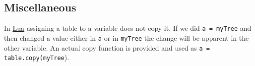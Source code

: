 \documentclass[../D+Manual.tex]{subfiles}
\begin{document}
\subsection{Miscellaneous}

In \href{http://www.lua.org/}{Lua} assigning a table to a variable does not copy it.
If we did \lstinline{a = myTree} and then changed a value either in \lstinline{a} or in \lstinline{myTree} the change will be apparent in the other variable.
An actual copy function is provided and used as \lstinline{a = table.copy(myTree}).
\end{document}
